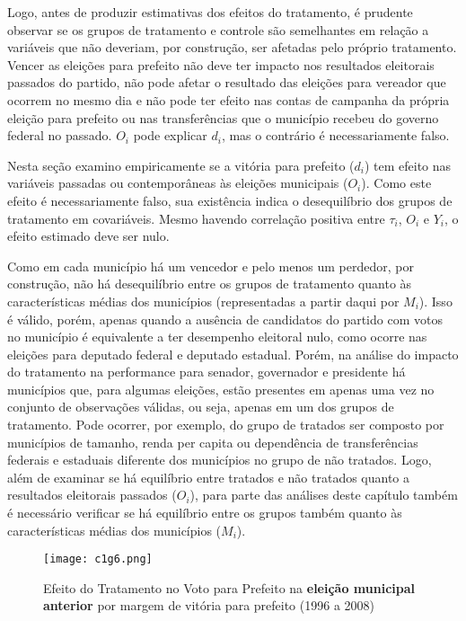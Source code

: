 Logo, antes de produzir estimativas dos efeitos do tratamento, é prudente observar se os grupos de tratamento e controle são semelhantes em relação a variáveis que não deveriam, por construção, ser afetadas pelo próprio tratamento. Vencer as eleições para prefeito não deve ter impacto nos resultados eleitorais passados do partido, não pode afetar o resultado das eleições para vereador que ocorrem no mesmo dia e não pode ter efeito nas contas de campanha da própria eleição para prefeito ou nas transferências que o município recebeu do governo federal no passado. $O_{i}$ pode explicar $d_{i}$, mas o contrário é necessariamente falso.

Nesta seção examino empiricamente se a vitória para prefeito ($d_{i}$) tem efeito nas variáveis passadas ou contemporâneas às eleições municipais ($O_{i}$). Como este efeito é necessariamente falso, sua existência indica o desequilíbrio dos grupos de tratamento em covariáveis. Mesmo havendo correlação positiva entre $\tau_{i}$, $O_{i}$ e $Y_{i}$, o efeito estimado deve ser nulo.

Como em cada município há um vencedor e pelo menos um perdedor, por construção, não há desequilíbrio entre os grupos de tratamento quanto às características médias dos municípios (representadas a partir daqui por $M_{i}$). Isso é válido, porém, apenas quando a ausência de candidatos do partido com votos no município é equivalente a ter desempenho eleitoral nulo, como ocorre nas eleições para deputado federal e deputado estadual. Porém, na análise do impacto do tratamento na performance para senador, governador e presidente há municípios que, para algumas eleições, estão presentes em apenas uma vez no conjunto de observações válidas, ou seja, apenas em um dos grupos de tratamento. Pode ocorrer, por exemplo, do grupo de tratados ser composto por municípios de tamanho, renda per capita ou dependência de transferências federais e estaduais diferente dos municípios no grupo de não tratados. Logo, além de examinar se há equilíbrio entre tratados e não tratados quanto a resultados eleitorais passados ($O_{i}$), para parte das análises deste capítulo também é necessário verificar se há equilíbrio entre os grupos também quanto às características médias dos municípios ($M_{i}$).

\begin{figure}[htp]
	\centering
	\texttt{[image: c1g6.png]}
	\caption{Efeito do Tratamento no Voto para Prefeito na \textbf{eleição municipal anterior} por margem de vitória para prefeito (1996 a 2008)}
	\label{fig:c1g6} 
\end{figure}


